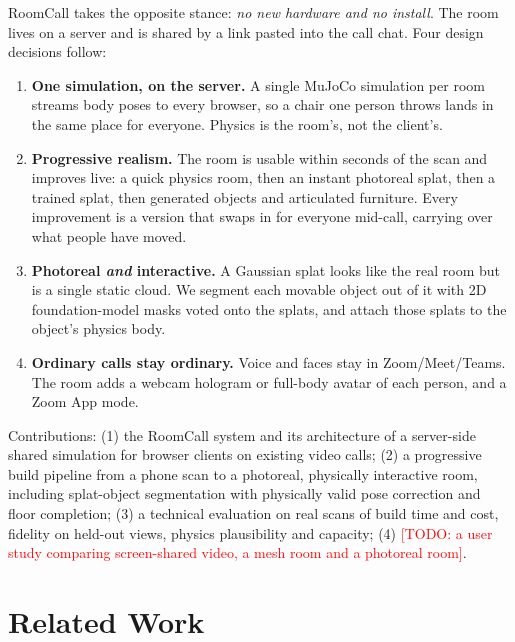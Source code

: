\documentclass[sigconf,review,anonymous]{acmart}
\newcommand{\todo}[1]{\textcolor{red}{[TODO: #1]}}
\newcommand{\sys}{RoomCall}
\begin{document}
\sys{} takes the opposite stance: \emph{no new hardware and no install}. The room lives on a
server and is shared by a link pasted into the call chat. Four design decisions follow:
\begin{enumerate}
  \item \textbf{One simulation, on the server.} A single MuJoCo simulation per room streams body
        poses to every browser, so a chair one person throws lands in the same place for
        everyone. Physics is the room's, not the client's.
  \item \textbf{Progressive realism.} The room is usable within seconds of the scan and improves
        live: a quick physics room, then an instant photoreal splat, then a trained splat, then
        generated objects and articulated furniture. Every improvement is a version that swaps
        in for everyone mid-call, carrying over what people have moved.
  \item \textbf{Photoreal \emph{and} interactive.} A Gaussian splat looks like the real room but
        is a single static cloud. We segment each movable object out of it with 2D foundation-model
        masks voted onto the splats, and attach those splats to the object's physics body.
  \item \textbf{Ordinary calls stay ordinary.} Voice and faces stay in Zoom/Meet/Teams. The room
        adds a webcam hologram or full-body avatar of each person, and a Zoom App mode.
\end{enumerate}

\noindent Contributions:
(1) the \sys{} system and its architecture of a server-side shared simulation for browser
clients on existing video calls;
(2) a progressive build pipeline from a phone scan to a photoreal, physically interactive room,
including splat-object segmentation with physically valid pose correction and floor completion;
(3) a technical evaluation on real scans of build time and cost, fidelity on held-out views,
physics plausibility and capacity;
(4) \todo{a user study comparing screen-shared video, a mesh room and a photoreal room}.

\section{Related Work}
\end{document}
